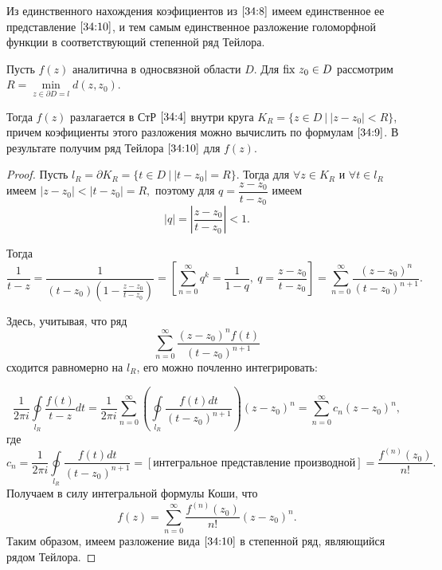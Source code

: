 \documentclass[../../main.tex]{subfiles}
\begin{document}
Из единственного нахождения коэфициентов из $ \eqref{34:8} $ имеем 
единственное ее представление $ \eqref{34:10} $, и тем самым единственное 
разложение голоморфной функции в соответствующий степенной ряд Тейлора.

\begin{thm}
	Пусть $ f(z) $ аналитична в односвязной области $ D $. Для $ \operatorname{fix}\, z_0 \in D 
	$ рассмотрим $ R = \underset{z \in \partial D = l}{\min}d(z, z_0) $.
	
	Тогда $ f(z) $ разлагается в СтР $ \eqref{34:4} $ внутри круга $ K_R = \{z 
	\in D\ |\ |z - z_0| < R \} $, причем коэфициенты этого разложения можно 
	вычислить по формулам $ \eqref{34:9} $.
	В результате получим ряд Тейлора $ \eqref{34:10} $ для $f(z)$.
\end{thm}

\begin{proof}
	Пусть $ l_R = \partial K_R = \{t \in D\ |\ |t - z_0| = R \} $. Тогда для 
	$ \forall z \in K_R $ и $ \forall t \in l_R $ имеем
	$ |z - z_0| < |t - z_0| = R, $
	поэтому для $ q = \dfrac{z - z_0}{t - z_0} $ имеем
	\[ |q| = \left|\frac{z - z_0}{t - z_0}\right| < 1. \]
	
	Тогда
	\[ \frac{1}{t - z} = \frac{1}{(t - z_0)(1 - \frac{z - z_0}{t - z_0})} = 
	\left[ \sum\limits_{n = 0}^{\infty}q^k = \frac{1}{1 - q},\ q = \frac{z - 
	z_0}{t - z_0} \right] = \sum\limits_{n = 0}^{\infty}\frac{(z - z_0)^n}{(t - 
	z_0)^{n + 1}}. \]
	
	Здесь, учитывая, что ряд
	\[ \sum\limits_{n = 0}^{\infty}\frac{(z - z_0)^n f(t)}{(t - z_0)^{n + 1}} \]
	сходится равномерно на $ l_R $, его можно почленно интегрировать:
	
	\[ \frac{1}{2 \pi i} \underset{l_R}\oint \frac{f(t)}{t - z} dt = 
	\frac{1}{2 \pi i} \sum\limits_{n = 0}^{\infty} \left( 
	\underset{l_R}\oint\frac{f(t)dt}{(t - z_0)^{n + 1}} \right)(z - z_0)^n = 
	\sum\limits_{n = 0}^{\infty} c_n (z - z_0)^n, \]
	где
	\[ c_n = \frac{1}{2 \pi i} \underset{l_R}\oint\frac{f(t)dt}{(t - z_0)^{n + 
	1}} = [\text{интегральное представление производной}] = \frac{f^{(n)}(z_0)}{n!}. \]
	Получаем в силу интегральной формулы Коши, что
	\[ f(z) = \sum\limits_{n = 0}^{\infty} \frac{f^{(n)}(z_0)}{n!} (z - z_0)^n. \]
	Таким образом, имеем разложение вида $ \eqref{34:10} $ в степенной ряд, являющийся рядом 
	Тейлора.
 \end{proof}
\end{document}

